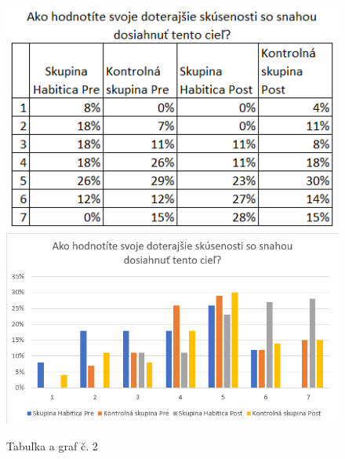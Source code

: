 \documentclass[10pt,twoside,slovak,a4paper]{article}
\begin{document}
\begin{figure}[h]
	\caption{Tabuľka a graf č. 2}
	\includegraphics[scale=0.7]{skusenostiTable.png}
	\includegraphics[scale=0.5]{skusenosti.png}
	\centering
\end{figure}
\end{document}
